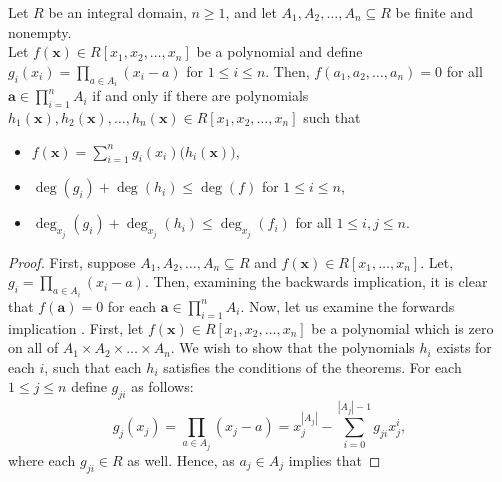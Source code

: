 \begin{theorem} Let $R$ be an integral domain, \(n\ge 1\), and let
			$A_1, A_2, \ldots, A_n \subseteq R$ be finite and
			nonempty.\\ Let $f\left( \textbf{x} \right) \in R[x_1,
			x_2, \ldots, x_{n}]$ be a polynomial and define $g_i
			\left( x_{i} \right) = \prod_{a \in A_i}^{} \left( x_i
			-a \right)  $ for $1 \le i \le n$. Then, $f\left( a_1, a_2, \ldots, a_n \right) = 0$
			for all  $ \textbf{a} \in \prod_{i= 1}^{n} A_i $ if and only if
			there are polynomials $h_1\left( \textbf{x} \right) ,
			h_2 \left( \textbf{x} \right) , \ldots, h_n \left(
			\textbf{x} \right)  \in R[x_1, x_2, \ldots, x_{n}]$
			such that
\begin{itemize}
	\item \(f\left( \textbf{x} \right) = \sum_{i= 1}^{n} g_{i}\left( x_{i} \right) \Big( h_{i}\left( \textbf{x} \right)  \Big)  \),
		\item \(\deg \left( g_{i} \right) + \deg \left( h_{i} \right) \le \deg \left( f \right)\) for \(1 \le i  \le n\),
			\item \(\deg _{x_{j}} \left(g_{i} \right) + \deg _{x_{j}} \left(h_{i} \right) \le \deg _{x_{j}} \left(f_{i} \right)   \) for all \(1\le i , j \le n\).
\end{itemize}
\end{theorem}	\begin{proof} First, suppose \(A_1, A_2, \ldots, A_{n} \subseteq R\) and \(f\left( \textbf{x} \right) \in R\left[ x_1, \ldots, x_{n} \right]  \). Let, \(g_{i} = \prod_{a \in A_{i}}^{} \left( x_{i} - a \right)  \). Then,  examining the backwards implication, it is
clear that \(f\left( \textbf{a}		\right)  = 0\) for each  $\textbf{a} \in \prod_{i= 1}^{n} A_i $. Now, let us examine the
		forwards implication . First, let $f\left( \textbf{x} \right) \in R[x_1,
		x_2, \ldots, x_{n}]$ be a polynomial which is zero on all of \(A_1 \times A_2 \times \ldots \times A_{n}\). We wish to show that the polynomials $h_i$ exists for each $i$, such that each \(h_{i}\) satisfies the conditions of the theorems.  For each $1\le j \le n$
		define \(g_{ji}\) as follows: \begin{equation} \label{combnull1}
			g_j \left( x_j \right) = \prod_{a \in
	A_j}^{} \left( x_j - a \right) = x_{j}^{\left| A_j \right|} -
	\sum_{i=0}^{\left| A_j  \right| -1 } g_{ji} x_j ^{ i} ,\end{equation}
	where each $g_{ji} \in R$ as well. Hence, as $a_j \in A_j$ implies that

\end{proof}
